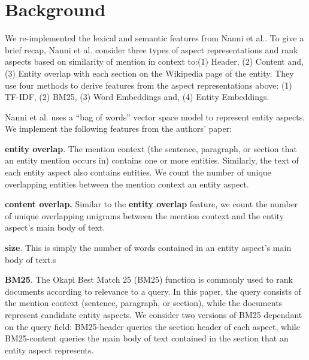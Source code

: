 \section{Background}
\label{sec:Background}

We re-implemented the lexical and semantic features from Nanni et
al.\cite{nanni2018entity}. To give a brief recap, Nanni et al.\cite{nanni2018entity} consider three types of aspect representations and rank aspects based on similarity of mention in context to:(1) Header, (2) Content and, (3) Entity overlap with each section on the Wikipedia page of the entity. They use four methods to derive features from the aspect representations above: (1) TF-IDF, (2) BM25, (3) Word Embeddings and, (4) Entity Embeddings. 

\label{entity-aspect-representation}




Nanni et al. \cite{nanni2018entity} uses a ``bag of words'' vector space model to represent entity aspects. We implement the following features from the authors' paper:

\textbf{entity overlap}. The mention context (the sentence, paragraph, or section that an entity mention occurs in) contains one or more entities. Similarly, the text of each entity aspect also contains entities. We count the number of unique overlapping entities between the mention context an entity aspect.

\textbf{content overlap.} Similar to the \textbf{entity overlap} feature, we count the number of unique overlapping unigrams between the mention context and the entity aspect's main body of text.

\textbf{size}. This is simply the number of words contained in an entity aspect's main body of text.s

\textbf{BM25}. The Okapi Best Match 25 (BM25) function is commonly used to rank documents according to relevance to a query. In this paper, the query consists of the mention context (sentence, paragraph, or section), while the documents represent candidate entity aspects. We consider two versions of BM25 dependant on the query field: BM25-header queries the section header of each aspect, while BM25-content queries the main body of text contained in the section that an entity aspect represents.

